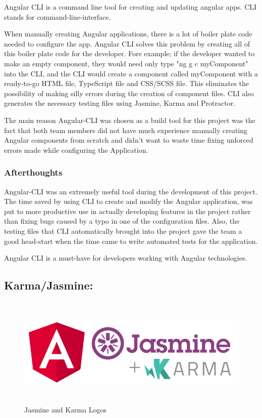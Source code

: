 \bigskip

Angular CLI is a command line tool for creating and updating angular apps. CLI stands for command-line-interface. 

When manually creating Angular applications, there is a lot of boiler plate code needed to configure the app. Angular CLI solves this problem by creating all of this boiler plate code for the developer. Fore example; if the developer wanted to make an empty component, they would need only type "ng g c myComponent" into the CLI, and the CLI would create a component called myComponent with a ready-to-go HTML file, TypeScript file and CSS/SCSS file. This eliminates the possibility of making silly errors during the creation of component files. CLI also generates the necessary testing files using Jasmine, Karma and Protractor.

\bigskip

The main reason Angular-CLI was chosen as a build tool for this project was the fact that both team members did not have much experience manually creating Angular components from scratch and didn't want to waste time fixing unforced errors made while configuring the Application. 

\subsubsection{Afterthoughts}
Angular-CLI was an extremely useful tool during the development of this project. The time saved by using CLI to create and modify the Angular application, was put to more productive use in actually developing features in the project rather than fixing bugs caused by a typo in one of the configuration files. Also, the testing files that CLI automatically brought into the project gave the team a good head-start when the time came to write automated tests for the application. 

\bigskip

Angular CLI is a must-have for developers working with Angular technologies.


\subsection{Karma/Jasmine:}
\label{sec:TechnologyReviewKarma}

\begin{figure}[H]
    \centering
    \includegraphics[width=\textwidth, height=150pt]{img/JasmineKarmaLogo.PNG}
    \caption{Jasmine and Karma Logos}
    \label{fig:my_label}
\end{figure}

